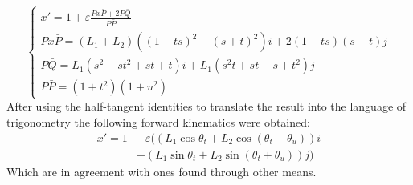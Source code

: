   \begin{equation}
   \begin{cases}
        x' = 1 + \varepsilon\frac{Px\bar{P} + 2P\bar{Q}}{P\bar{P}}\\
        Px\bar{P} = (L_1+L_2)((1-ts)^2 - (s+t)^2)i+2(1-ts)(s+t)j\\
        P\bar{Q} = L_1(s^2-s t^2+s t+t)i + L_1(s^2 t+s t-s+t^2)j\\
        P\bar{P} = (1+t^2)(1+u^2)
   \end{cases}
   \end{equation}
After using the half-tangent identities to translate the result into the language of trigonometry the following forward kinematics were obtained:
   \begin{equation}
   \begin{aligned}
          x' = 1 &+ \varepsilon((L_1\cos{\theta_t} + L_2\cos{(\theta_t+\theta_u)})i\\
        &+(L_1\sin{\theta_t} + L_2\sin{(\theta_t+\theta_u)})j)
   \end{aligned}
   \end{equation}
Which are in agreement with ones found through other means.


